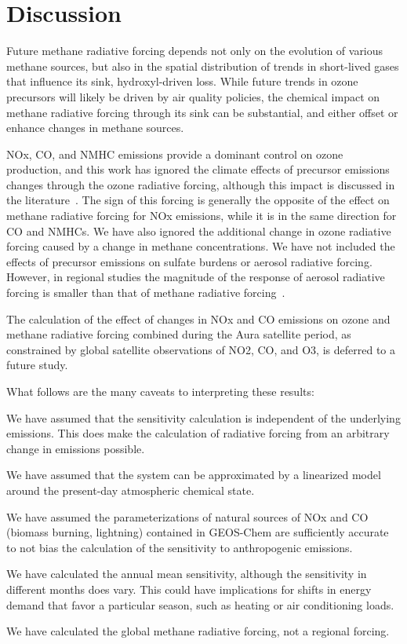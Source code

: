 \section{Discussion}

Future methane radiative forcing depends not only on the evolution of various methane sources, but also in the spatial distribution of trends in short-lived gases that influence its sink, hydroxyl-driven loss. While future trends in ozone precursors will likely be driven by air quality policies, the chemical impact on methane radiative forcing through its sink can be substantial, and either offset or enhance changes in methane sources.

NOx, CO, and NMHC emissions provide a dominant control on ozone production, and this work has ignored the climate effects of precursor emissions changes through the ozone radiative forcing, although this impact is discussed in the literature~\citep{ref:shindell2013}. The sign of this forcing is generally the opposite of the effect on methane radiative forcing for NOx emissions, while it is in the same direction for CO and NMHCs. We have also ignored the additional change in ozone radiative forcing caused by a change in methane concentrations. We have not included the effects of precursor emissions on sulfate burdens or aerosol radiative forcing. However, in regional studies the magnitude of the response of aerosol radiative forcing is smaller than that of methane radiative forcing~\citep{ref:fry2012}.

The calculation of the effect of changes in NOx and CO emissions on ozone and methane radiative forcing combined during the Aura satellite period, as constrained by global satellite observations of NO2, CO, and O3, is deferred to a future study. 

What follows are the many caveats to interpreting these results:

We have assumed that the sensitivity calculation is independent of the underlying emissions. This does make the calculation of radiative forcing from an arbitrary change in emissions possible.

We have assumed that the system can be approximated by a linearized model around the present-day atmospheric chemical state.



We have assumed the parameterizations of natural sources of NOx and CO (biomass burning, lightning) contained in GEOS-Chem are sufficiently accurate to not bias the calculation of the sensitivity to anthropogenic emissions.

We have calculated the annual mean sensitivity, although the sensitivity in different months does vary. This could have implications for shifts in energy demand that favor a particular season, such as heating or air conditioning loads.

We have calculated the global methane radiative forcing, not a regional forcing.
